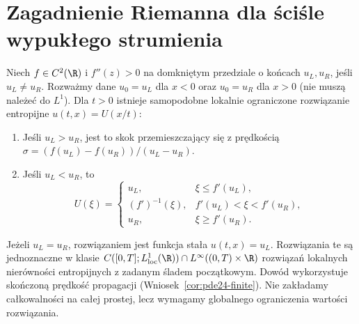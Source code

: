 \section{Zagadnienie Riemanna dla ściśle wypukłego strumienia}
\begin{twierdzenie}
\label{thm:pde24-riemann}
Niech $f\in C^2(\R)$ i $f''(z)>0$ na domkniętym
przedziale o końcach $u_L,u_R$, jeśli $u_L\ne u_R$. Rozważmy dane $u_0=u_L$ dla $x<0$ oraz
$u_0=u_R$ dla $x>0$ (nie muszą należeć do $L^1$).
Dla $t>0$ istnieje samopodobne lokalnie ograniczone
rozwiązanie entropijne $u(t,x)=U(x/t)$:
\begin{enumerate}
\item Jeśli $u_L>u_R$, jest to skok przemieszczający się
z prędkością $\sigma=(f(u_L)-f(u_R))/(u_L-u_R)$.
\item Jeśli $u_L<u_R$, to
\[
 U(\xi)=\begin{cases}
 u_L,&\xi\le f'(u_L),\\
 (f')^{-1}(\xi),&f'(u_L)<\xi<f'(u_R),\\
 u_R,&\xi\ge f'(u_R).
 \end{cases}
\]
\end{enumerate}
Jeżeli $u_L=u_R$, rozwiązaniem jest funkcja stała $u(t,x)=u_L$.
Rozwiązania te są jednoznaczne w klasie
$C([0,T];L^1_{\mathrm{loc}}(\R))\cap L^\infty((0,T)\times\R)$
rozwiązań lokalnych nierówności entropijnych z zadanym
śladem początkowym. Dowód wykorzystuje skończoną prędkość
propagacji (Wniosek~\ref{cor:pde24-finite}).
Nie zakładamy całkowalności na całej prostej, lecz
wymagamy globalnego ograniczenia wartości rozwiązania.
\end{twierdzenie}
